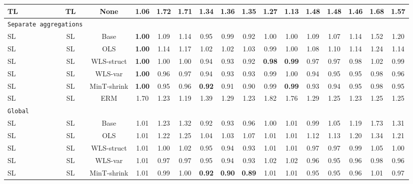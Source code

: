 \documentclass[preprint, 3p, times, twocolumn]{elsarticle}
\begin{document}
\begin{table}
\begin{center}
{\begin{tabular}{l c  cccccccccccccc}
    \hspace{0.1cm} 	TL	&TL	&None	&1.06	&1.72	&1.71	&1.34	&1.36	&1.35	&1.27	&1.13	&1.48	&1.48	&1.46	&1.68	&1.57	\\
    \midrule																	
    \multicolumn{2}{l}{\texttt{Separate aggregations}}																	\\
    \hspace{0.1cm} 	SL	&SL	&Base	&\textbf{1.00}	&1.09	&1.14	&0.95	&0.99	&0.92	&1.00	&1.00	&1.09	&1.07	&1.14	&1.52	&1.20	\\
    \hspace{0.1cm} 	SL	&SL	&OLS	&\textbf{1.00}	&1.14	&1.17	&1.02	&1.02	&1.03	&0.99	&1.00	&1.08	&1.10	&1.14	&1.24	&1.14	\\
    \hspace{0.1cm} 	SL	&SL	&WLS-struct	&\textbf{1.00}	&1.00	&1.00	&0.94	&0.93	&0.92	&\textbf{0.98}	&\textbf{0.99}	&0.97	&0.97	&0.98	&1.02	&0.99	\\
    \hspace{0.1cm} 	SL	&SL	&WLS-var	&\textbf{1.00}	&0.96	&0.97	&0.94	&0.93	&0.93	&0.99	&1.00	&0.94	&0.95	&0.95	&0.98	&0.96	\\
    \hspace{0.1cm} 	SL	&SL	&MinT-shrink	&\textbf{1.00}	&0.95	&0.96	&\textbf{0.92}	&0.91	&0.90	&0.99	&\textbf{0.99}	&0.93	&0.94	&0.95	&0.98	&0.95	\\
    \hspace{0.1cm} 	SL	&SL	&ERM	&1.70	&1.23	&1.19	&1.39	&1.29	&1.23	&1.82	&1.76	&1.29	&1.25	&1.23	&1.25	&1.25	\\
    \midrule																	
    \texttt{Global}																	\\
    \hspace{0.1cm} 	SL	&SL	&Base	&1.01	&1.23	&1.32	&0.92	&0.93	&0.96	&1.00	&1.01	&0.99	&1.05	&1.19	&1.73	&1.31	\\
    \hspace{0.1cm} 	SL	&SL	&OLS	&1.01	&1.22	&1.25	&1.04	&1.03	&1.07	&1.01	&1.01	&1.12	&1.13	&1.20	&1.34	&1.21	\\
    \hspace{0.1cm} 	SL	&SL	&WLS-struct	&1.01	&1.00	&1.02	&0.95	&0.94	&0.93	&1.01	&1.01	&0.97	&0.97	&0.99	&1.05	&1.00	\\
    \hspace{0.1cm} 	SL	&SL	&WLS-var	&1.01	&0.97	&0.97	&0.95	&0.94	&0.93	&1.02	&1.02	&0.96	&0.95	&0.96	&0.98	&0.96	\\
    \hspace{0.1cm} 	SL	&SL	&MinT-shrink	&1.01	&0.99	&1.00	&\textbf{0.92} &\textbf{0.90}	&\textbf{0.89}	&1.01	&1.01	&0.95	&0.95	&0.96	&1.01	&0.97	\\

\end{tabular}}
\end{center}
\end{table}
\end{document}
